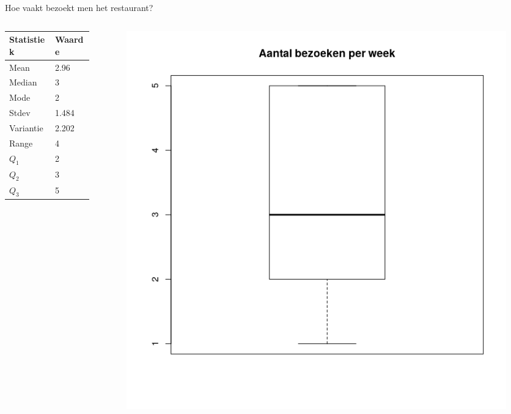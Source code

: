 \documentclass[aspectratio=169]{beamer}
\begin{document}
\begin{frame}{Hoe vaakt bezoekt men het restaurant?}
  \begin{columns}
    \begin{column}{0.5\textwidth}
      \begin{table}[h]
        \small
        \begin{tabular}{|l|l|}
          \hline
          { \textbf{Statistiek}} & \textbf{Waarde} \\ \hline
          Mean                   & 2.96            \\ \hline
          Median                 & 3               \\ \hline
          Mode                   & 2               \\ \hline
          Stdev                  & 1.484           \\ \hline
          Variantie              & 2.202           \\ \hline
          Range                  & 4               \\ \hline
          $Q_{1}$                & 2               \\ \hline
          $Q_{2}$                & 3               \\ \hline
          $Q_{3}$                & 5               \\ \hline
        \end{tabular}
      \end{table}
    \end{column}
    \begin{column}{0.5\textwidth}

      \begin{figure}
        \centering
        \includegraphics[height=.8\textheight]{img/2var-boxplot-aantalbezoeken}
        \label{fig:boxplotStudenten}
      \end{figure}


\end{column}
\end{columns}
\end{frame}
\end{document}
